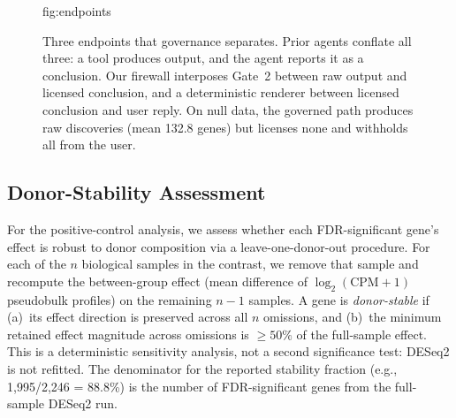 \documentclass[pmlr,twocolumn,10pt]{jmlr}
\begin{document}
\begin{figure}[htbp]
\floatconts
  {fig:endpoints}
  {\caption{Three endpoints that governance separates. Prior agents conflate
  all three: a tool produces output, and the agent reports it as a conclusion.
  Our firewall interposes Gate~2 between raw output and licensed conclusion, and
  a deterministic renderer between licensed conclusion and user reply. On null
  data, the governed path produces raw discoveries (mean 132.8 genes) but
  licenses none and withholds all from the user.}}
  {%
  }
\end{figure}

\subsection{Donor-Stability Assessment}

For the positive-control analysis, we assess whether each FDR-significant gene's
effect is robust to donor composition via a leave-one-donor-out procedure. For
each of the $n$ biological samples in the contrast, we remove that sample and
recompute the between-group effect (mean difference of $\log_2(\text{CPM}+1)$
pseudobulk profiles) on the remaining $n{-}1$ samples. A gene is
\textit{donor-stable} if (a)~its effect direction is preserved across all $n$
omissions, and (b)~the minimum retained effect magnitude across omissions is
${\geq}50\%$ of the full-sample effect. This is a deterministic sensitivity
analysis, not a second significance test: DESeq2 is not refitted. The
denominator for the reported stability fraction (e.g., 1{,}995/2{,}246 =
88.8\%) is the number of FDR-significant genes from the full-sample DESeq2 run.
\end{document}
